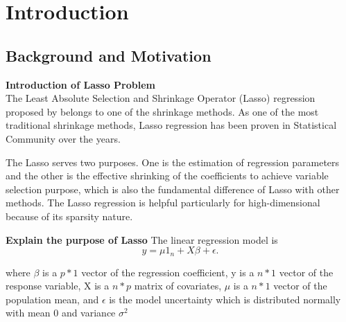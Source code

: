 \chapter{Introduction}
\label{Chapter1}
\section{Background and Motivation}




\textbf{Introduction of Lasso Problem}\\
The Least Absolute Selection and Shrinkage Operator (Lasso) regression proposed by \cite{tibshirani_1996} belongs to one of the shrinkage methods. As one of the most traditional shrinkage methods, Lasso regression has been proven in Statistical Community over the years.

The Lasso serves two purposes. One is the estimation of regression parameters and the other is the effective shrinking of the coefficients to achieve variable selection purpose, which is also the fundamental difference of Lasso with other methods. The Lasso regression is helpful particularly for high-dimensional because of its sparsity nature.

\textbf{Explain the purpose of Lasso}
The linear regression model is
\begin{equation}
	\label{eq:LRmodel}
	y = \mu 1_n + X\beta + \epsilon.
\end{equation} 

where $\beta$ is a $p*1$ vector of the regression coefficient, y is a $n*1$ vector of the response variable, X is a $n*p$ matrix of covariates, $\mu$ is a $n*1$ vector of the population mean, and $\epsilon$ is the model uncertainty which is distributed normally with mean 0 and variance $\sigma^2$

